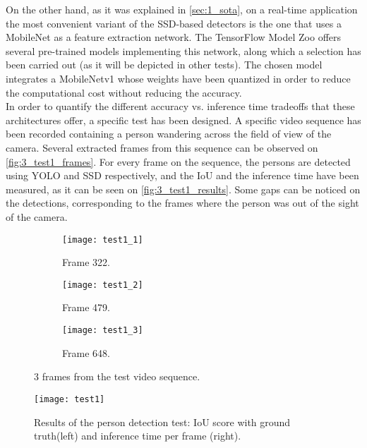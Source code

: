 On the other hand, as it was explained in \autoref{sec:1_sota}, on a real-time application the most convenient variant of the SSD-based detectors is the one that uses a MobileNet \cite{mobilenet} as a feature extraction network. The TensorFlow Model Zoo \cite{model_zoo} offers several pre-trained models implementing this network, along which a selection has been carried out (as it will be depicted in other tests). The chosen model integrates a MobileNetv1 whose weights have been quantized \cite{ssd_quantization} in order to reduce the computational cost without reducing the accuracy.\\


In order to quantify the different accuracy vs. inference time tradeoffs that these architectures offer, a specific test has been designed. A specific video sequence has been recorded containing a person wandering across the field of view of the camera. Several extracted frames from this sequence can be observed on \autoref{fig:3_test1_frames}. For every frame on the sequence, the persons are detected using YOLO and SSD respectively, and the IoU and the inference time have been measured, as it can be seen on \autoref{fig:3_test1_results}. Some gaps can be noticed on the detections, corresponding to the frames where the person was out of the sight of the camera.

\begin{figure}[h]
	\centering
	\begin{subfigure}[b]{0.3\linewidth}
		\centering
		\texttt{[image: test1\_1]}
		\caption{Frame 322.}
	\end{subfigure}
	\begin{subfigure}[b]{0.3\linewidth}
		\centering
		\texttt{[image: test1\_2]}
		\caption{Frame 479.}
	\end{subfigure}
	\begin{subfigure}[b]{0.3\linewidth}
		\centering
		\texttt{[image: test1\_3]}
		\caption{Frame 648.}
	\end{subfigure}
	\caption{3 frames from the test video sequence.}
	\label{fig:3_test1_frames}
\end{figure}




\begin{figure}[h]
	\centering
	\texttt{[image: test1]}
	\caption{Results of the person detection test: IoU score with ground truth(left) and inference time per frame (right).}
	\label{fig:3_test1_results}
\end{figure}

